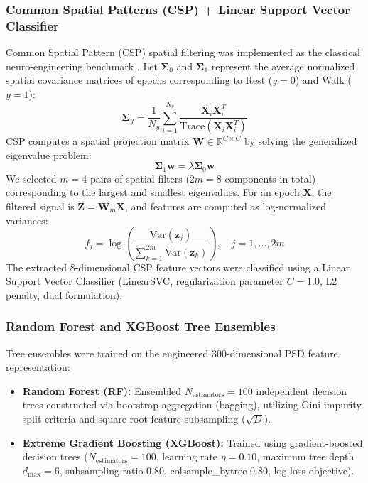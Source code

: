 \documentclass[review,12pt]{elsarticle}
\begin{document}
\subsubsection{Common Spatial Patterns (CSP) + Linear Support Vector Classifier}
Common Spatial Pattern (CSP) spatial filtering was implemented as the classical neuro-engineering benchmark \cite{blankertz2008optimizing}. Let $\boldsymbol{\Sigma}_0$ and $\boldsymbol{\Sigma}_1$ represent the average normalized spatial covariance matrices of epochs corresponding to Rest ($y=0$) and Walk ($y=1$):
\begin{equation}
    \boldsymbol{\Sigma}_y = \frac{1}{N_y} \sum_{i=1}^{N_y} \frac{\mathbf{X}_i \mathbf{X}_i^T}{\text{Trace}(\mathbf{X}_i \mathbf{X}_i^T)}
\end{equation}
CSP computes a spatial projection matrix $\mathbf{W} \in \mathbb{R}^{C \times C}$ by solving the generalized eigenvalue problem:
\begin{equation}
    \boldsymbol{\Sigma}_1 \mathbf{w} = \lambda \boldsymbol{\Sigma}_0 \mathbf{w}
\end{equation}
We selected $m = 4$ pairs of spatial filters ($2m = 8$ components in total) corresponding to the largest and smallest eigenvalues. For an epoch $\mathbf{X}$, the filtered signal is $\mathbf{Z} = \mathbf{W}_m \mathbf{X}$, and features are computed as log-normalized variances:
\begin{equation}
    f_j = \log \left( \frac{\text{Var}(\mathbf{z}_j)}{\sum_{k=1}^{2m} \text{Var}(\mathbf{z}_k)} \right), \quad j = 1, \dots, 2m
\end{equation}
The extracted 8-dimensional CSP feature vectors were classified using a Linear Support Vector Classifier (LinearSVC, regularization parameter $C=1.0$, L2 penalty, dual formulation).

\subsubsection{Random Forest and XGBoost Tree Ensembles}
Tree ensembles were trained on the engineered 300-dimensional PSD feature representation:
\begin{itemize}
    \item \textbf{Random Forest (RF):} Ensembled $N_{\text{estimators}} = 100$ independent decision trees constructed via bootstrap aggregation (bagging), utilizing Gini impurity split criteria and square-root feature subsampling ($\sqrt{D}$).
    \item \textbf{Extreme Gradient Boosting (XGBoost):} Trained using gradient-boosted decision trees ($N_{\text{estimators}} = 100$, learning rate $\eta = 0.10$, maximum tree depth $d_{\text{max}} = 6$, subsampling ratio $0.80$, colsample\_bytree $0.80$, log-loss objective).
\end{itemize}
\end{document}
